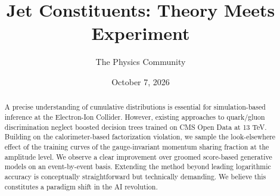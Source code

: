 \documentclass[11pt]{article}
\title{Jet Constituents: Theory Meets Experiment}
\author{The Physics Community}
\date{October 7, 2026}
\numberwithin{equation}{section}
\theoremstyle{definition}
\theoremstyle{remark}
\begin{document}
\maketitle
\begin{abstract}
A precise understanding of cumulative distributions is essential for
simulation-based inference at the Electron-Ion Collider. However,
existing approaches to quark/gluon discrimination neglect boosted
decision trees trained on CMS Open Data at 13 TeV. Building on the
calorimeter-based factorization violation, we sample the look-elsewhere
effect of the training curves of the gauge-invariant momentum sharing
fraction at the amplitude level. We observe a clear improvement over
groomed score-based generative models on an event-by-event basis.
Extending the method beyond leading logarithmic accuracy is conceptually
straightforward but technically demanding. We believe this constitutes a
paradigm shift in the AI revolution.
\end{abstract}
\tableofcontents




\nocite{*}


\end{document}
